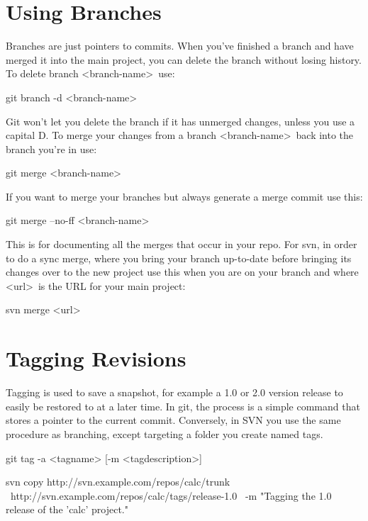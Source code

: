\documentclass[oneside]{book}
\begin{document}
\section{Using Branches}
Branches are just pointers to commits. When you've finished a branch and have merged it into the main project, you can delete the branch without losing history.
To delete branch \textless branch-name\textgreater\ use:
    \begin{gitcode}
    git branch -d <branch-name>
    \end{gitcode}
Git won't let you delete the branch if it has unmerged changes, unless you use a capital D.
To merge your changes from a branch \textless branch-name\textgreater\ back into the branch you're in use:
    \begin{gitcode}
    git merge <branch-name>
    \end{gitcode}
If you want to merge your branches but always generate a merge commit use this:
    \begin{gitcode}
    git merge --no-ff <branch-name>
    \end{gitcode}
This is for documenting all the merges that occur in your repo.
\newline
\vspace{1mm}
\newline
For svn, in order to do a sync merge, where you bring your branch up-to-date before bringing its changes over to the new project use this when you are on your branch and where \textless url\textgreater\  is the URL for your main project:
    \begin{svncode}
    svn merge <url>
    \end{svncode}

    

\section{Tagging Revisions}
Tagging is used to save a snapshot, for example a 1.0 or 2.0 version release to easily be restored to at a later time. In git, the process is a simple command that stores a pointer to the current commit. Conversely, in SVN you use the same procedure as branching, except targeting a folder you create named tags.
    \begin{gitcode}
    git tag -a <tagname> [-m <tagdescription>]
    \end{gitcode}
    \begin{svncode}
    svn copy http://svn.example.com/repos/calc/trunk \
           http://svn.example.com/repos/calc/tags/release-1.0 \
      -m "Tagging the 1.0 release of the 'calc' project."
    \end{svncode}
    
\end{document}
